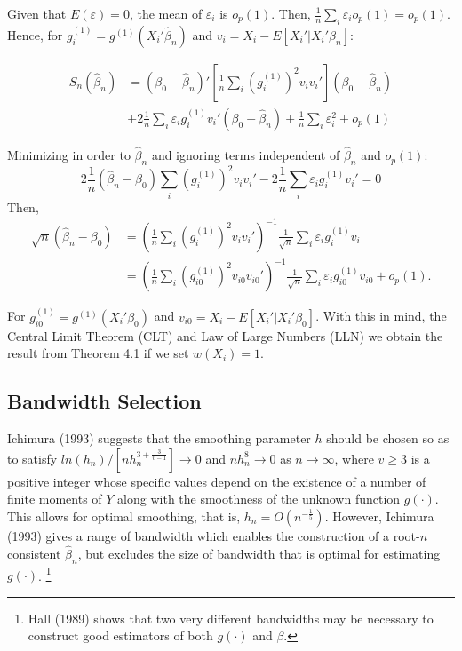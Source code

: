 \documentclass[a4paper]{article}
\begin{document}
Given that $E(\varepsilon) = 0$, the mean of $\varepsilon_i$ is $o_p(1)$. Then, $\frac{1}{n}\sum_i\varepsilon_io_p(1) = o_p(1)$. Hence, for $g_{i}^{(1)} = g^{(1)}(X_i'\hat{\beta}_n)$ and $v_i = X_i - E[X_i'|X_i'\beta_n]$:

\begin{align*}
S_{n}(\hat{\beta}_n) & = (\beta_0 - \hat{\beta}_n)'\left[\frac{1}{n}\sum_i (g_i^{(1)})^2v_iv_i'\right](\beta_0 - \hat{\beta}_n) \\
             & + 2\frac{1}{n}\sum_i\varepsilon_ig_i^{(1)}v_i'(\beta_0 - \hat{\beta}_n) + \frac{1}{n}\sum_i \varepsilon_i^2 + o_p(1)
\end{align*}

Minimizing in order to $\hat{\beta}_n$ and ignoring terms independent of $\hat{\beta}_n$ and $o_p(1)$:
\[2\frac{1}{n}(\hat{\beta}_n - \beta_0)\sum_i(g_{i}^{(1)})^2v_iv_i' - 2\frac{1}{n}\sum_i\varepsilon_ig_i^{(1)}v_i' = 0 \]
Then, 
\begin{align*}
\sqrt{n}(\hat{\beta}_n - \beta_0) & = (\frac{1}{n}\sum_i(g_{i}^{(1)})^2v_iv_i')^{-1}\frac{1}{\sqrt{n}}\sum_i\varepsilon_i g_{i}^{(1)}v_i \\
     					  & = (\frac{1}{n}\sum_i(g_{i0}^{(1)})^2v_{i0}v_{i0}')^{-1}\frac{1}{\sqrt{n}}\sum_i\varepsilon_i g_{i0}^{(1)}v_{i0} + o_p(1).
\end{align*}

For $g_{i0}^{(1)} = g^{(1)}(X_i'\beta_0)$ and $v_{i0} = X_i - E[X_i'|X_i'\beta_0]$. With this in mind, the Central Limit Theorem (CLT) and Law of Large Numbers (LLN) we obtain the result from Theorem 4.1 if we set $w(X_i) = 1$.




\subsection{Bandwidth Selection} %
\label{sub:Bandwidth Selection}

Ichimura (1993) suggests that the smoothing parameter $h$ should be chosen so as to satisfy
 $ln(h_n)/[nh_n^{3 + \frac{3}{v-1}}] \rightarrow 0$ and $nh_n^8 \rightarrow 0$ as $n \rightarrow \infty $, where $v \geq 3$ is a positive integer whose specific values depend on the existence of a number of finite moments  of $Y$ along with the smoothness of the unknown function $g(\cdot)$. This allows for optimal smoothing, that is, $h_n = O(n^{-\frac{1}{5}})$. However, Ichimura (1993) gives a range of bandwidth which enables the construction of a root-$n$ consistent $\hat{\beta}_n$, but excludes the size of bandwidth that is optimal for estimating $g(\cdot)$. \footnote{Hall (1989) shows that two very different bandwidths may be necessary to construct good estimators of both $g(\cdot)$ and $\beta$.}
 
\end{document}
